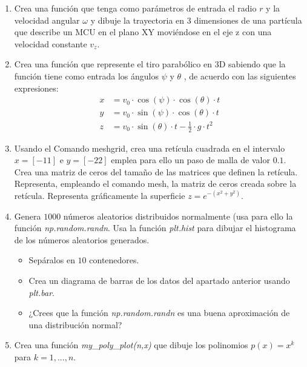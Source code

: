 \begin{enumerate}
\item Crea una función que tenga como parámetros de entrada el radio $r$ y
la velocidad angular $\omega$ y dibuje la trayectoria en 3 dimensiones de una partícula que describe un MCU en el plano XY moviéndose en el eje z con una velocidad constante $v_z$.

\item Crea una función que represente el tiro parabólico en 3D sabiendo
que la función tiene como entrada los ángulos $\psi$ y $\theta$ , de acuerdo con las siguientes expresiones:
\begin{align*}
    x&=v_0 \cdot \cos(\psi)\cdot \cos(\theta) \cdot t \\
    y&=v_0 \cdot \sin(\psi)\cdot \cos(\theta) \cdot t  \\
    z&=v_0 \cdot \sin(\theta) \cdot t- \frac{1}{2} \cdot g \cdot t^2
\end{align*}

\item Usando el Comando meshgrid, crea una retícula cuadrada en el intervalo $x = [-1 1]$ e  $y = [-2 2]$ emplea para ello un paso de malla de valor $0.1$. Crea una matriz de ceros del tamaño de las matrices que definen la retícula. Representa, empleando el comando mesh, la matriz de ceros
creada sobre la retícula. Representa gráficamente la superficie $z = e^{-(x^2+y^2)}$. 

\item Genera $1000$ números aleatorios distribuidos normalmente (usa para ello la función \emph{np.random.randn}. Usa la función \emph{plt.hist} para dibujar el histograma de los números aleatorios generados. 
\begin{itemize}
    \item Sepáralos en $10$ contenedores.
    \item Crea un diagrama de barras de los datos del apartado anterior usando  \emph{plt.bar}.
    \item ¿Crees que la función \emph{np.random.randn} es una buena aproximación de una distribución normal?
\end{itemize}

\item  Crea una función \emph{my\_poly\_plot(n,x)} que dibuje los polinomios $p(x)=x^k$ para $k=1,...,n$.


\end{enumerate}
